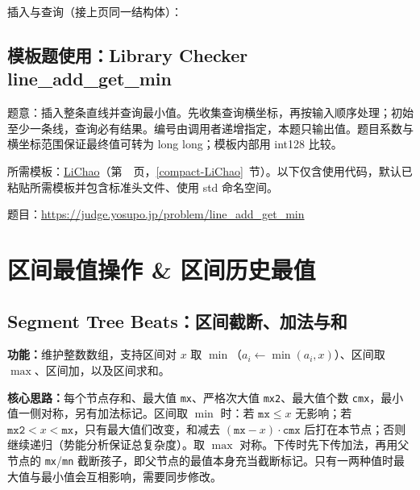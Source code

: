 \Needspace{572pt}



\newpage

\noindent 插入与查询（接上页同一结构体）：



\Needspace{561pt}

\subsection*{模板题使用：Library Checker line\_add\_get\_min}

\label{usage-example-89}

题意：插入整条直线并查询最小值。先收集查询横坐标，再按输入顺序处理；初始至少一条线，查询必有结果。编号由调用者递增指定，本题只输出值。题目系数与横坐标范围保证最终值可转为 long long；模板内部用 int128 比较。

所需模板：\hyperref[compact-LiChao]{LiChao}（第~\pageref{compact-LiChao}~页，\ref{compact-LiChao}~节）。以下仅含使用代码，默认已粘贴所需模板并包含标准头文件、使用 std 命名空间。

题目：\url{https://judge.yosupo.jp/problem/line_add_get_min}



\Needspace{180pt}

\section{区间最值操作 \& 区间历史最值}

\subsection{Segment Tree Beats：区间截断、加法与和}\label{compact-SegmentBeats}

\noindent\textbf{功能：}\allowbreak 维护整数数组，支持区间对 $x$ 取 $\min$（$a_i\leftarrow\min(a_i,x)$）、区间取 $\max$、区间加，以及区间求和。

\textbf{核心思路：}\allowbreak 每个节点存和、最大值 \texttt{mx}、严格次大值 \texttt{mx2}、最大值个数 \texttt{cmx}，最小值一侧对称，另有加法标记。区间取 $\min$ 时：若 $\texttt{mx}\le x$ 无影响；若 $\texttt{mx2}<x<\texttt{mx}$，只有最大值们改变，和减去 $(\texttt{mx}-x)\cdot\texttt{cmx}$ 后打在本节点；否则继续递归（势能分析保证总复杂度）。取 $\max$ 对称。下传时先下传加法，再用父节点的 \texttt{mx}/\texttt{mn} 截断孩子，即父节点的最值本身充当截断标记。只有一两种值时最大值与最小值会互相影响，需要同步修改。

